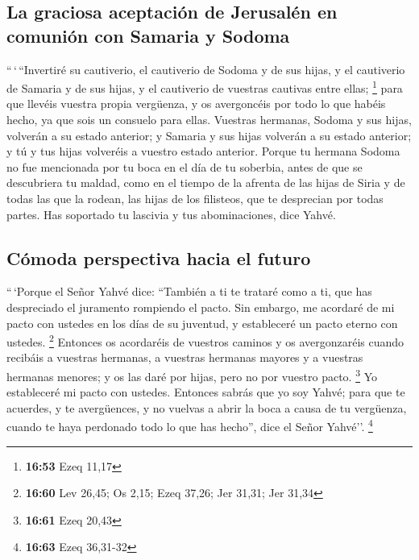 \begin{paracol}{2}
\hypertarget{la-graciosa-aceptaciuxf3n-de-jerusaluxe9n-en-comuniuxf3n-con-samaria-y-sodoma}{%
\subsection{La graciosa aceptación de Jerusalén en comunión con Samaria
y
Sodoma}\label{la-graciosa-aceptaciuxf3n-de-jerusaluxe9n-en-comuniuxf3n-con-samaria-y-sodoma}}

 ``\,`\,``Invertiré su cautiverio, el cautiverio de
Sodoma y de sus hijas, y el cautiverio de Samaria y de sus hijas, y el
cautiverio de vuestras cautivas entre ellas; \footnote{\textbf{16:53}
  Ezeq 11,17}  para que llevéis vuestra propia vergüenza,
y os avergoncéis por todo lo que habéis hecho, ya que sois un consuelo
para ellas.  Vuestras hermanas, Sodoma y sus hijas,
volverán a su estado anterior; y Samaria y sus hijas volverán a su
estado anterior; y tú y tus hijas volveréis a vuestro estado anterior.
 Porque tu hermana Sodoma no fue mencionada por tu boca
en el día de tu soberbia,  antes de que se descubriera tu
maldad, como en el tiempo de la afrenta de las hijas de Siria y de todas
las que la rodean, las hijas de los filisteos, que te desprecian por
todas partes.  Has soportado tu lascivia y tus
abominaciones, dice Yahvé.

\hypertarget{cuxf3moda-perspectiva-hacia-el-futuro}{%
\subsection{Cómoda perspectiva hacia el
futuro}\label{cuxf3moda-perspectiva-hacia-el-futuro}}

 ``\,`Porque el Señor Yahvé dice: ``También a ti te
trataré como a ti, que has despreciado el juramento rompiendo el pacto.
 Sin embargo, me acordaré de mi pacto con ustedes en los
días de su juventud, y estableceré un pacto eterno con ustedes.
\footnote{\textbf{16:60} Lev 26,45; Os 2,15; Ezeq 37,26; Jer 31,31; Jer
  31,34}  Entonces os acordaréis de vuestros caminos y os
avergonzaréis cuando recibáis a vuestras hermanas, a vuestras hermanas
mayores y a vuestras hermanas menores; y os las daré por hijas, pero no
por vuestro pacto. \footnote{\textbf{16:61} Ezeq 20,43} 
Yo estableceré mi pacto con ustedes. Entonces sabrás que yo soy Yahvé;
 para que te acuerdes, y te avergüences, y no vuelvas a
abrir la boca a causa de tu vergüenza, cuando te haya perdonado todo lo
que has hecho'', dice el Señor Yahvé''. \footnote{\textbf{16:63} Ezeq
  36,31-32}


\end{paracol}
